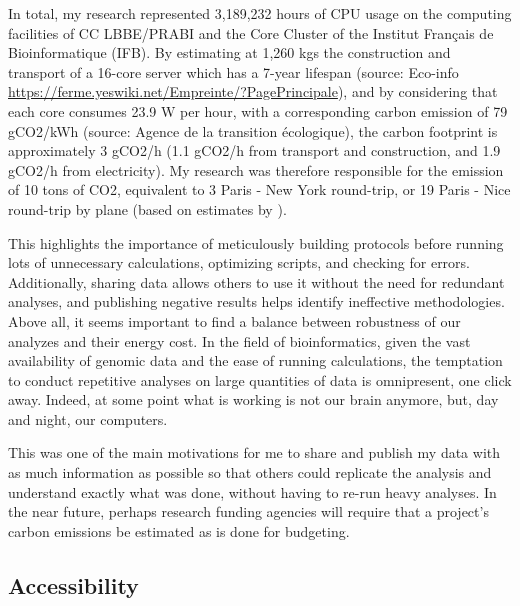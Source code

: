 In total, my research represented 3,189,232 hours of CPU usage on the computing facilities of CC LBBE/PRABI and the Core Cluster of the Institut Français de Bioinformatique (IFB). By estimating at 1,260 kgs the construction and transport of a 16-core server which has a 7-year lifespan (source: Eco-info \url{https://ferme.yeswiki.net/Empreinte/?PagePrincipale}), and by considering that each core consumes 23.9 W per hour, with a corresponding carbon emission of 79 gCO2/kWh (source: Agence de la transition écologique), the carbon footprint is approximately 3 gCO2/h (1.1 gCO2/h from transport and construction, and 1.9 gCO2/h from electricity). My research was therefore responsible for the emission of 10 tons of CO2, equivalent to 3 Paris - New York round-trip, or 19 Paris - Nice round-trip by plane (based on estimates by \citet{ayoun_quelle_2021}).

This highlights the importance of meticulously building protocols before running lots of unnecessary calculations, optimizing scripts, and checking for errors. Additionally, sharing data allows others to use it without the need for redundant analyses, and publishing negative results helps identify ineffective methodologies. Above all, it seems important to find a balance between robustness of our analyzes and their energy cost. In the field of bioinformatics, given the vast availability of genomic data and the ease of running calculations, the temptation to conduct repetitive analyses on large quantities of data is omnipresent, one click away. Indeed, at some point what is working is not our brain anymore, but, day and night, our computers.

This was one of the main motivations for me to share and publish my data with as much information as possible so that others could replicate the analysis and understand exactly what was done, without having to re-run heavy analyses. In the near future, perhaps research funding agencies will require that a project's carbon emissions be estimated as is done for budgeting.

\subsection{Accessibility}

